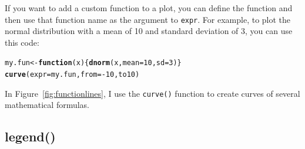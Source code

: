 \documentclass{tufte-book}\usepackage[]{graphicx}\usepackage[]{color}
\makeatletter
\newcommand{\hlkwd}[1]{\textcolor[rgb]{0.737,0.353,0.396}{\textbf{#1}}}%
\newenvironment{kframe}{%
 \def\at@end@of@kframe{}%
 \ifinner\ifhmode%
  \def\at@end@of@kframe{\end{minipage}}%
  \begin{minipage}{\columnwidth}%
 \fi\fi%
 \def\FrameCommand##1{\hskip\@totalleftmargin \hskip-\fboxsep
 \colorbox{shadecolor}{##1}\hskip-\fboxsep
     \hskip-\linewidth \hskip-\@totalleftmargin \hskip\columnwidth}%
 \MakeFramed {\advance\hsize-\width
   \@totalleftmargin\z@ \linewidth\hsize
   \@setminipage}}%
 {\par\unskip\endMakeFramed%
 \at@end@of@kframe}
\newenvironment{knitrout}{}{} %
\makeatother
\begin{document}
If you want to add a custom function to a plot, you can define the function and then use that function name as the argument to \texttt{expr}. For example, to plot the normal distribution with a mean of 10 and standard deviation of 3, you can use this code:

\begin{knitrout}
\color{fgcolor}\begin{kframe}
\begin{alltt}
my.fun <- \hlkwd{function}(x) \{\hlkwd{dnorm}(x, mean = 10, sd = 3)\}
\hlkwd{curve}(expr = my.fun, from = -10, to 10)
\end{alltt}
\end{kframe}
\end{knitrout}


In Figure~\ref{fig:functionlines}, I use the \texttt{curve()} function to create curves of several mathematical formulas.


\pagebreak
\subsection{legend()}
\end{document}
